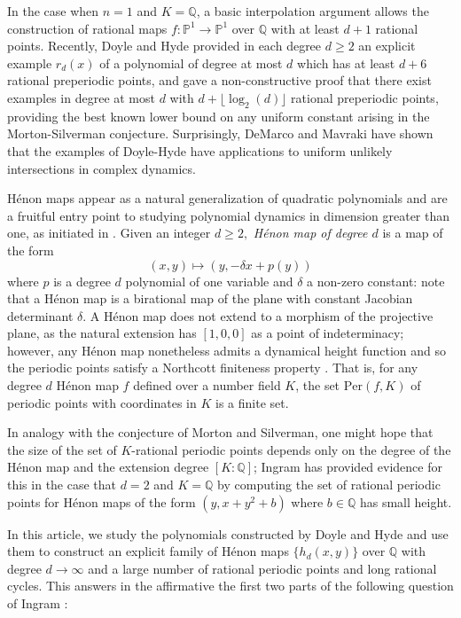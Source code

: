 \documentclass[12pt]{amsart}
\theoremstyle{definition}
\begin{document}
In the case when $n = 1$ and $K=\mathbb{Q}$, a basic interpolation argument allows the construction of rational maps $f: \mathbb{P}^1 \rightarrow \mathbb{P}^1$ over $\mathbb{Q}$ with at least $d+1$ rational points.  Recently, Doyle and Hyde \cite{doyle2022polynomialsrationalpreperiodicpoints} provided in each degree $d \geq 2$ an explicit example $r_d(x)$ of a polynomial of degree at most $d$ which has at least $d+6$ rational preperiodic points, and gave a non-constructive proof that there exist examples in degree at most $d$ with $d + \lfloor \log_2(d) \rfloor$ rational preperiodic points, providing the best known lower bound on any uniform constant arising in the Morton-Silverman conjecture.  Surprisingly, DeMarco and Mavraki \cite{DeMarco_Mavraki_2024} have shown that the examples of Doyle-Hyde have applications to uniform unlikely intersections in complex dynamics.

H\'enon maps appear as a natural generalization of quadratic polynomials and are a fruitful entry point to studying polynomial dynamics in dimension greater than one, as initiated in \cite{hubbard}. Given an integer $d \geq 2,$ \emph{H\'enon map of degree $d$} is a map of the form 
$$(x,y) \mapsto (y, -\delta x + p(y))$$
where $p$ is a degree $d$ polynomial of one variable and $\delta$ a non-zero constant: note that a H\'enon map is a birational map of the plane with constant Jacobian determinant $\delta$. A H\'enon map does not extend to a morphism of the projective plane, as the natural extension has $[1,0,0]$ as a point of indeterminacy; however, any H\'enon map  nonetheless admits a dynamical height function and so the periodic points satisfy a Northcott finiteness property \cite{silverman_henon, kawaguchi_canonical_height}.  That is, for any degree $d$ H\'enon map $f$ defined over a number field $K$, the set $\mathrm{Per}(f,K)$  of periodic points with coordinates in $K$ is a finite set.  

In analogy with the conjecture of Morton and Silverman, one might hope that the size of the set of $K$-rational periodic points depends only on the degree of the H\'enon map and the extension degree $[K:\mathbb{Q}]$; Ingram \cite{ingram_henon_smallheight} has provided evidence for this in the case that $d = 2$ and $K = \mathbb{Q}$ by computing the set of rational periodic points for H\'enon maps of the form $(y, x +y^2+b)$ where $b \in \mathbb{Q}$ has small height.

In this article, we study the polynomials constructed by Doyle and Hyde and use them to construct an explicit family of H\'enon maps $\{ h_d(x,y) \}$ over $\mathbb{Q}$ with degree $d \rightarrow \infty$ and a large number of rational periodic points and long rational cycles.  This answers in the affirmative the first two parts of the following question of Ingram \cite{henon_openqs}:
\end{document}
